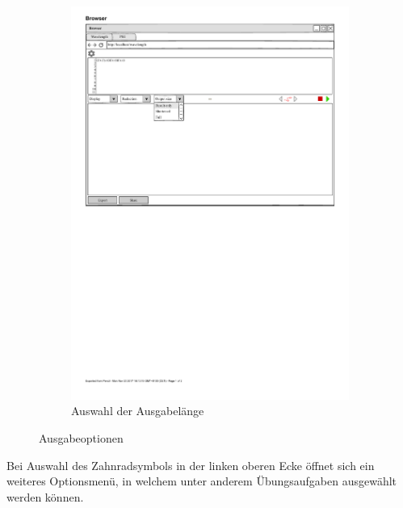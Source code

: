 \documentclass[parskip=full,11pt,twoside]{scrartcl}
\begin{document}
\begin{figure}[H]
\begin{subfigure}[r]{0.25\textwidth}
		\includegraphics{img/outputSizeMenu}
	\caption{Auswahl der Ausgabelänge}	
	\end{subfigure}
	\caption{\label{fig:outputOptions} Ausgabeoptionen}
\end{figure}

Bei Auswahl des Zahnradsymbols in der linken oberen Ecke öffnet sich ein weiteres Optionsmenü, in welchem unter anderem Übungsaufgaben ausgewählt werden können. 
\end{document}
